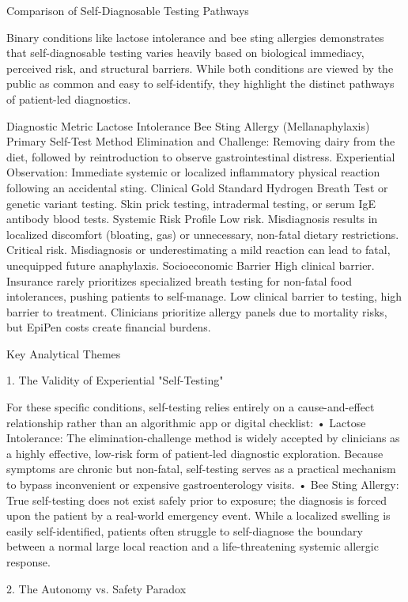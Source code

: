 Comparison of Self-Diagnosable Testing Pathways

Binary conditions like lactose intolerance and bee sting allergies demonstrates that self-diagnosable testing varies heavily based on biological immediacy, perceived risk, and structural barriers. While both conditions are viewed by the public as common and easy to self-identify, they highlight the distinct pathways of patient-led diagnostics.

Diagnostic Metric	Lactose Intolerance	Bee Sting Allergy (Mellanaphylaxis)
Primary Self-Test Method	Elimination and Challenge: Removing dairy from the diet, followed by reintroduction to observe gastrointestinal distress.	Experiential Observation: Immediate systemic or localized inflammatory physical reaction following an accidental sting.
Clinical Gold Standard	Hydrogen Breath Test or genetic variant testing.	Skin prick testing, intradermal testing, or serum IgE antibody blood tests.
Systemic Risk Profile	Low risk. Misdiagnosis results in localized discomfort (bloating, gas) or unnecessary, non-fatal dietary restrictions.	Critical risk. Misdiagnosis or underestimating a mild reaction can lead to fatal, unequipped future anaphylaxis.
Socioeconomic Barrier	High clinical barrier. Insurance rarely prioritizes specialized breath testing for non-fatal food intolerances, pushing patients to self-manage.	Low clinical barrier to testing, high barrier to treatment. Clinicians prioritize allergy panels due to mortality risks, but EpiPen costs create financial burdens.


Key Analytical Themes


1. The Validity of Experiential "Self-Testing"

For these specific conditions, self-testing relies entirely on a cause-and-effect relationship rather than an algorithmic app or digital checklist:
• Lactose Intolerance: The elimination-challenge method is widely accepted by clinicians as a highly effective, low-risk form of patient-led diagnostic exploration. Because symptoms are chronic but non-fatal, self-testing serves as a practical mechanism to bypass inconvenient or expensive gastroenterology visits.
• Bee Sting Allergy: True self-testing does not exist safely prior to exposure; the diagnosis is forced upon the patient by a real-world emergency event. While a localized swelling is easily self-identified, patients often struggle to self-diagnose the boundary between a normal large local reaction and a life-threatening systemic allergic response.

2. The Autonomy vs. Safety Paradox

